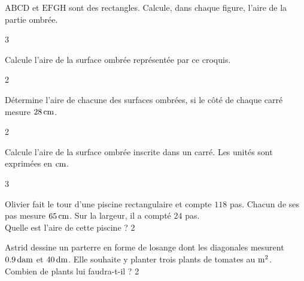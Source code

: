 \documentclass[a4paper,11pt]{report}
\let\oldcenter\center
\let\oldendcenter\endcenter
\renewenvironment{center}{\setlength\topsep{-10pt}\oldcenter}{\oldendcenter}
\begin{document}
\begin{exo}{
$\mathrm{ABCD}$ et $\mathrm{EFGH}$ sont des rectangles. Calcule, dans chaque figure, l'aire de la partie ombrée.
\begin{center}
    
\end{center}
}{3}    
\end{exo}

\begin{exo}{
Calcule l'aire de la surface ombrée représentée par ce croquis.
\begin{center}
  
\end{center}
}{2}
\end{exo}

\begin{exo}{
		Détermine l'aire de chacune des surfaces ombrées, si le côté de chaque carré mesure $\tunit{28}{cm}$.

}{2}
\end{exo}


\newpage
\begin{exo}{
		Calcule l'aire de la surface ombrée inscrite dans un carré. Les unités sont exprimées en $\tunit{}{cm}$.
    \begin{center}
        
    \end{center}
}{3}
\end{exo}


\begin{exo}{
		Olivier fait le tour d'une piscine rectangulaire et compte $118$ pas. Chacun de ses pas mesure $\tunit{65}{cm}$. Sur la largeur, il a compté $24$ pas. \\ Quelle est l'aire de cette piscine ?
}{2} 
\end{exo}

\begin{exo}{
		Astrid dessine un parterre en forme de losange dont les diagonales mesurent $\tunit{0,9}{dam}$ et $\tunit{40}{dm}$. Elle souhaite y planter trois plants de tomates au $\tunit{}{m^2}$. Combien de plants lui faudra-t-il ?
}{2}    
\end{exo}
\end{document}
